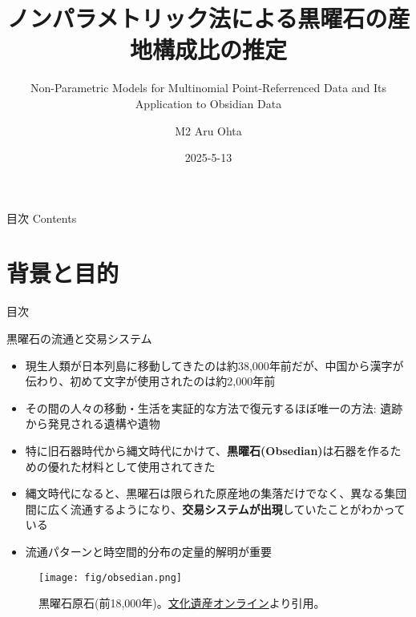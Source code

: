 \documentclass[xelatex, 8pt]{beamer}
\title[Contact: Aru Ohta (otaru1214@gmail.com)]{ノンパラメトリック法による黒曜石の産地構成比の推定}
\subtitle{Non-Parametric Models for Multinomial Point-Referrenced Data and Its Application to Obsidian Data}
\date[2025]{2025-5-13}
\author[M2 Aru Ohta]{M2 Aru Ohta}
\institute[Kyoto University]{京都大学情報学研究科}
\theoremstyle{plain}
\theoremstyle{definition}
\begin{document}
\frame{\titlepage}

\begin{frame}
{\Large 目次 Contents}
 \tableofcontents
\end{frame}

\section{背景と目的}

\begin{frame}
{\Large 目次}
 \tableofcontents[currentsection]
\end{frame}

\begin{frame}{黒曜石の流通と交易システム}
    \begin{itemize}
        \item 現生人類が日本列島に移動してきたのは約38,000年前だが、中国から漢字が伝わり、初めて文字が使用されたのは約2,000年前
        \item その間の人々の移動・生活を実証的な方法で復元するほぼ唯一の方法: 遺跡から発見される遺構や遺物
        \item 特に旧石器時代から縄文時代にかけて、\textbf{黒曜石(Obsedian)}は石器を作るための優れた材料として使用されてきた
        \item 縄文時代になると、黒曜石は限られた原産地の集落だけでなく、異なる集団間に広く流通するようになり、\textbf{交易システムが出現}していたことがわかっている
        \item 流通パターンと時空間的分布の定量的解明が重要
    \end{itemize}

    \begin{figure}
        \centering
        \texttt{[image: fig/obsedian.png]}
        \caption{黒曜石原石(前18,000年)。\href{https://bunka.nii.ac.jp/heritages/detail/515934}{文化遺産オンライン}より引用。}
        \label{fig:enter-label}
    \end{figure}

\end{frame}
\end{document}
